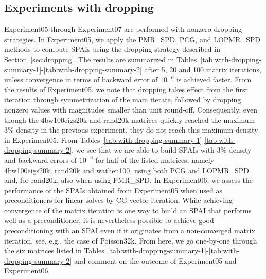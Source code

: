 \documentclass[numbers,webpdf,imanum]{ima-authoring-template}%
\theoremstyle{thmstyletwo}%
\numberwithin{equation}{section}
\begin{document}
\subsection{Experiments with dropping}\label{sec:dropping-experiments}
Experiment05 through Experiment07 are performed with nonzero dropping strategies.
In Experiment05, we apply the PMR\_SPD, PCG, and LOPMR\_SPD methods to compute SPAIs using the dropping strategy described in Section~\ref{sec:dropping}. 
The results are summarized in Tables~\ref{tab:with-dropping-summary-1}-\ref{tab:with-dropping-summary-2} after 5, 20 and 100 matrix iterations, unless convergence in terms of backward error of $10^{-6}$ is achieved faster.
From the results of Experiment05, we note that dropping takes effect from the first iteration through symmetrization of the main iterate, followed by dropping nonzero values with magnitudes smaller than unit round-off.
Consequently, even though the 4bw100eigs20k and rand20k matrices quickly reached the maximum 3\% density in the previous experiment, they do not reach this maximum density in Experiment05. 
From Tables~\ref{tab:with-dropping-summary-1}-\ref{tab:with-dropping-summary-2}, we see that we are able to build SPAIs with 3\% density and backward errors of $10^{-6}$ for half of the listed matrices, namely 4bw100eigs20k, rand20k and wathen100, using both PCG and LOPMR\_SPD and, for rand20k, also when using PMR\_SPD.
In Experiment06, we assess the performance of the SPAIs obtained from Experiment05 when used as preconditioners for linear solves by CG vector iteration.
While achieving convergence of the matrix iteration is one way to build an SPAI that performs well as a preconditioner, it is nevertheless possible to achieve good preconditioning with an SPAI even if it originates from a non-converged matrix iteration, see, e.g., the case of Poisson32k.
From here, we go one-by-one through the six matrices listed in Tables~\ref{tab:with-dropping-summary-1}-\ref{tab:with-dropping-summary-2} and comment on the outcome of Experiment05 and Experiment06.
\end{document}
